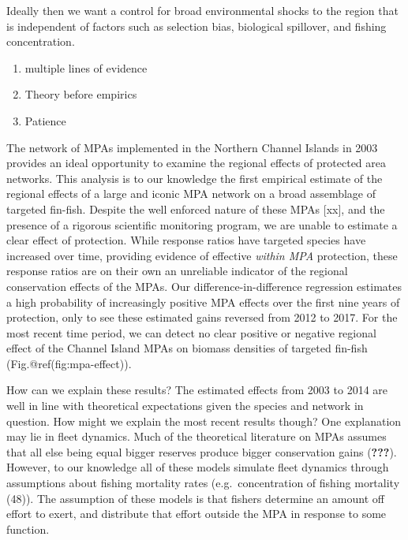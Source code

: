 \documentclass[9pt,twocolumn,twoside,lineno]{pnas-new}
\begin{document}
Ideally then we want a control for broad environmental shocks to the
region that is independent of factors such as selection bias, biological
spillover, and fishing concentration.

\begin{enumerate}
\def\labelenumi{\arabic{enumi}.}
\item
  multiple lines of evidence
\item
  Theory before empirics
\item
  Patience
\end{enumerate}

The network of MPAs implemented in the Northern Channel Islands in 2003
provides an ideal opportunity to examine the regional effects of
protected area networks. This analysis is to our knowledge the first
empirical estimate of the regional effects of a large and iconic MPA
network on a broad assemblage of targeted fin-fish. Despite the well
enforced nature of these MPAs {[}xx{]}, and the presence of a rigorous
scientific monitoring program, we are unable to estimate a clear effect
of protection. While response ratios have targeted species have
increased over time, providing evidence of effective \emph{within MPA}
protection, these response ratios are on their own an unreliable
indicator of the regional conservation effects of the MPAs. Our
difference-in-difference regression estimates a high probability of
increasingly positive MPA effects over the first nine years of
protection, only to see these estimated gains reversed from 2012 to
2017. For the most recent time period, we can detect no clear positive
or negative regional effect of the Channel Island MPAs on biomass
densities of targeted fin-fish (Fig.@ref(fig:mpa-effect)).

How can we explain these results? The estimated effects from 2003 to
2014 are well in line with theoretical expectations given the species
and network in question. How might we explain the most recent results
though? One explanation may lie in fleet dynamics. Much of the
theoretical literature on MPAs assumes that all else being equal bigger
reserves produce bigger conservation gains ({\textbf{???}}). However, to
our knowledge all of these models simulate fleet dynamics through
assumptions about fishing mortality rates (e.g.~concentration of fishing
mortality (48)). The assumption of these models is that fishers
determine an amount off effort to exert, and distribute that effort
outside the MPA in response to some function.
\end{document}
